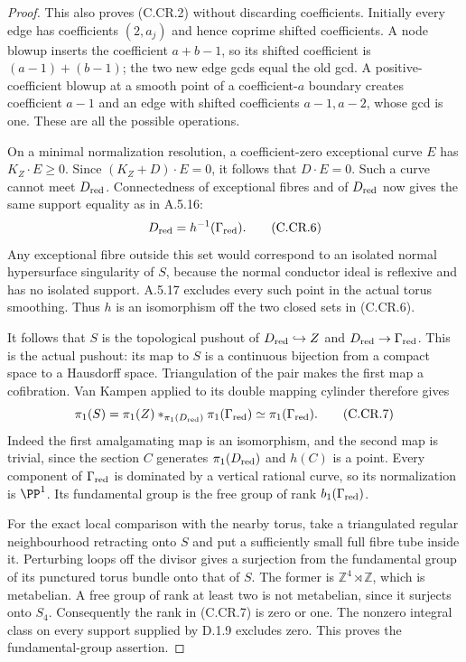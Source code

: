\begin{proof}
This also proves (C.CR.2) without discarding coefficients.
Initially every edge has coefficients $(2,a_j)$ and hence
coprime shifted coefficients. A node blowup inserts the
coefficient $a+b-1$, so its shifted coefficient is
$(a-1)+(b-1)$; the two new edge gcds equal the old gcd.
A positive-coefficient blowup at a smooth point of a
coefficient-$a$ boundary creates coefficient $a-1$ and
an edge with shifted coefficients $a-1,a-2$, whose gcd
is one. These are all the possible operations.

On a minimal normalization resolution, a coefficient-zero
exceptional curve $E$ has $K_Z\cdot E\ge0$. Since
$(K_Z+D)\cdot E=0$, it follows that $D\cdot E=0$.
Such a curve cannot meet $D_{\rm red}$. Connectedness of
exceptional fibres and of $D_{\rm red}$ now gives the same
support equality as in A.5.16:
\[
 D_{\rm red}=h^{-1}(\Gamma_{\rm red}).
\tag{C.CR.6}
\]
Any exceptional fibre outside this set would correspond to
an isolated normal hypersurface singularity of $S$, because
the normal conductor ideal is reflexive and has no isolated
support. A.5.17 excludes every such point in the actual
torus smoothing. Thus $h$ is an isomorphism off the two
closed sets in (C.CR.6).

It follows that $S$ is the topological pushout of
$D_{\rm red}\hookrightarrow Z$ and
$D_{\rm red}\to\Gamma_{\rm red}$. This is the actual
pushout: its map to $S$ is a continuous bijection from a
compact space to a Hausdorff space. Triangulation of the
pair makes the first map a cofibration. Van Kampen applied
to its double mapping cylinder therefore gives
\[
 \pi_1(S)=\pi_1(Z)*_{\pi_1(D_{\rm red})}
                         \pi_1(\Gamma_{\rm red})
          \simeq\pi_1(\Gamma_{\rm red}).
\tag{C.CR.7}
\]
Indeed the first amalgamating map is an isomorphism, and
the second map is trivial, since the section $C$ generates
$\pi_1(D_{\rm red})$ and $h(C)$ is a point. Every component
of $\Gamma_{\rm red}$ is dominated by a vertical rational
curve, so its normalization is $\PP^1$. Its fundamental
group is the free group of rank $b_1(\Gamma_{\rm red})$.

For the exact local comparison with the nearby torus, take
a triangulated regular neighbourhood retracting onto $S$
and put a sufficiently small full fibre tube inside it.
Perturbing loops off the divisor gives a surjection from
the fundamental group of its punctured torus bundle onto
that of $S$. The former is $\mathbb Z^4\rtimes\mathbb Z$,
which is metabelian. A free group of rank at least two
is not metabelian, since it surjects onto $S_4$.
Consequently the rank in (C.CR.7) is zero or one. The
nonzero integral class on every support supplied by D.1.9
excludes zero. This proves the fundamental-group assertion.


\end{proof}
